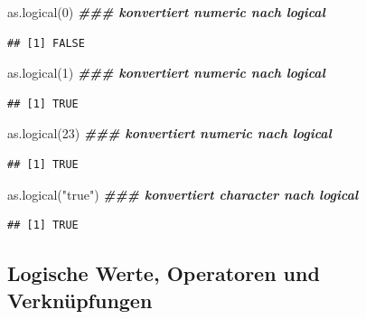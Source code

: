 \documentclass[
]{book}
\newenvironment{Shaded}{\begin{snugshade}}{\end{snugshade}}
\newcommand{\DecValTok}[1]{\textcolor[rgb]{0.00,0.00,0.81}{#1}}
\newcommand{\DocumentationTok}[1]{\textcolor[rgb]{0.56,0.35,0.01}{\textbf{\textit{#1}}}}
\newcommand{\FunctionTok}[1]{\textcolor[rgb]{0.00,0.00,0.00}{#1}}
\newcommand{\NormalTok}[1]{#1}
\newcommand{\StringTok}[1]{\textcolor[rgb]{0.31,0.60,0.02}{#1}}
\begin{document}
\begin{Shaded}
\begin{Highlighting}[]
\FunctionTok{as.logical}\NormalTok{(}\DecValTok{0}\NormalTok{)  }\DocumentationTok{\#\#\# konvertiert numeric nach logical}
\end{Highlighting}
\end{Shaded}

\begin{verbatim}
## [1] FALSE
\end{verbatim}

\begin{Shaded}
\begin{Highlighting}[]
\FunctionTok{as.logical}\NormalTok{(}\DecValTok{1}\NormalTok{)  }\DocumentationTok{\#\#\# konvertiert numeric nach logical }
\end{Highlighting}
\end{Shaded}

\begin{verbatim}
## [1] TRUE
\end{verbatim}

\begin{Shaded}
\begin{Highlighting}[]
\FunctionTok{as.logical}\NormalTok{(}\DecValTok{23}\NormalTok{)  }\DocumentationTok{\#\#\# konvertiert numeric nach logical}
\end{Highlighting}
\end{Shaded}

\begin{verbatim}
## [1] TRUE
\end{verbatim}

\begin{Shaded}
\begin{Highlighting}[]
\FunctionTok{as.logical}\NormalTok{(}\StringTok{"true"}\NormalTok{)  }\DocumentationTok{\#\#\# konvertiert character nach logical}
\end{Highlighting}
\end{Shaded}

\begin{verbatim}
## [1] TRUE
\end{verbatim}

\hypertarget{logische-werte-operatoren-und-verknuxfcpfungen}{%
\subsection*{Logische Werte, Operatoren und Verknüpfungen}\label{logische-werte-operatoren-und-verknuxfcpfungen}}
\end{document}
